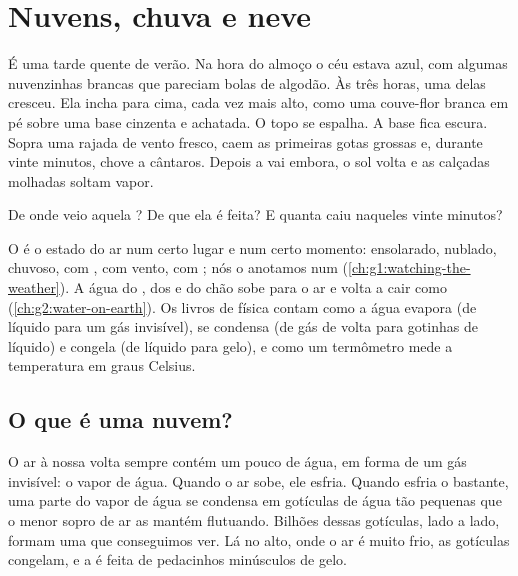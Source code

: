 \chapter{Nuvens, chuva e neve}\label{ch:g4:clouds-rain-snow}

É uma tarde quente de verão. Na hora do almoço o céu estava azul, com
algumas nuvenzinhas brancas que pareciam bolas de algodão. Às três horas,
uma delas cresceu. Ela incha para cima, cada vez mais alto, como uma
couve-flor branca em pé sobre uma base cinzenta e achatada. O topo se
espalha. A base fica escura. Sopra uma rajada de vento fresco, caem as
primeiras gotas grossas e, durante vinte minutos, chove a cântaros. Depois
a  vai embora, o sol volta e as calçadas molhadas soltam vapor.

De onde veio aquela ? De que ela é feita? E quanta  caiu
naqueles vinte minutos?

\begin{recall}
O  é o estado do ar num certo lugar e num certo momento: ensolarado,
nublado, chuvoso, com , com vento, com ; nós o anotamos num
 (\cref{ch:g1:watching-the-weather}). A água do , dos
 e do chão sobe para o ar e volta a cair como 
(\cref{ch:g2:water-on-earth}). Os livros de física contam como a água
evapora (de líquido para um gás invisível), se condensa (de gás de volta
para gotinhas de líquido) e congela (de líquido para gelo), e como um
termômetro mede a temperatura em graus Celsius.
\end{recall}

\section{O que é uma nuvem?}

O ar à nossa volta sempre contém um pouco de água, em forma de um gás
invisível: o vapor de água. Quando o ar sobe, ele esfria. Quando esfria o
bastante, uma parte do vapor de água se condensa em gotículas de água tão
pequenas que o menor sopro de ar as mantém flutuando. Bilhões dessas
gotículas, lado a lado, formam uma  que conseguimos ver. Lá no alto,
onde o ar é muito frio, as gotículas congelam, e a  é feita de
pedacinhos minúsculos de gelo.

